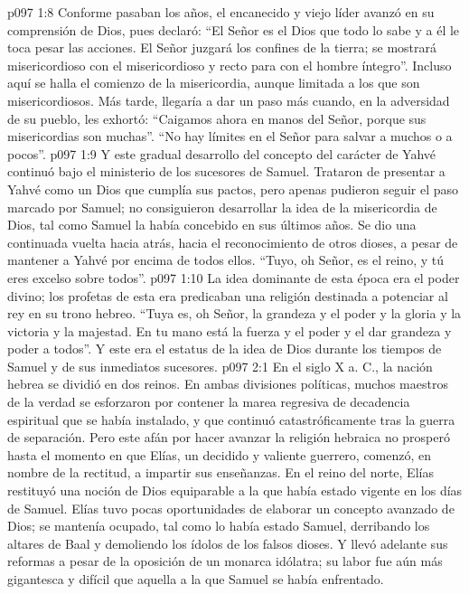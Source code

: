\vs p097 1:8 Conforme pasaban los años, el encanecido y viejo líder avanzó en su comprensión de Dios, pues declaró: “El Señor es el Dios que todo lo sabe y a él le toca pesar las acciones. El Señor juzgará los confines de la tierra; se mostrará misericordioso con el misericordioso y recto para con el hombre íntegro”. Incluso aquí se halla el comienzo de la misericordia, aunque limitada a los que son misericordiosos. Más tarde, llegaría a dar un paso más cuando, en la adversidad de su pueblo, les exhortó: “Caigamos ahora en manos del Señor, porque sus misericordias son muchas”. “No hay límites en el Señor para salvar a muchos o a pocos”.
\vs p097 1:9 \pc Y este gradual desarrollo del concepto del carácter de Yahvé continuó bajo el ministerio de los sucesores de Samuel. Trataron de presentar a Yahvé como un Dios que cumplía sus pactos, pero apenas pudieron seguir el paso marcado por Samuel; no consiguieron desarrollar la idea de la misericordia de Dios, tal como Samuel la había concebido en sus últimos años. Se dio una continuada vuelta hacia atrás, hacia el reconocimiento de otros dioses, a pesar de mantener a Yahvé por encima de todos ellos. “Tuyo, oh Señor, es el reino, y tú eres excelso sobre todos”.
\vs p097 1:10 La idea dominante de esta época era el poder divino; los profetas de esta era predicaban una religión destinada a potenciar al rey en su trono hebreo. “Tuya es, oh Señor, la grandeza y el poder y la gloria y la victoria y la majestad. En tu mano está la fuerza y el poder y el dar grandeza y poder a todos”. Y este era el estatus de la idea de Dios durante los tiempos de Samuel y de sus inmediatos sucesores.
\vs p097 2:1 En el siglo X a. C., la nación hebrea se dividió en dos reinos. En ambas divisiones políticas, muchos maestros de la verdad se esforzaron por contener la marea regresiva de decadencia espiritual que se había instalado, y que continuó catastróficamente tras la guerra de separación. Pero este afán por hacer avanzar la religión hebraica no prosperó hasta el momento en que Elías, un decidido y valiente guerrero, comenzó, en nombre de la rectitud, a impartir sus enseñanzas. En el reino del norte, Elías restituyó una noción de Dios equiparable a la que había estado vigente en los días de Samuel. Elías tuvo pocas oportunidades de elaborar un concepto avanzado de Dios; se mantenía ocupado, tal como lo había estado Samuel, derribando los altares de Baal y demoliendo los ídolos de los falsos dioses. Y llevó adelante sus reformas a pesar de la oposición de un monarca idólatra; su labor fue aún más gigantesca y difícil que aquella a la que Samuel se había enfrentado.
